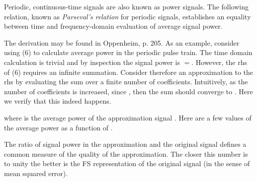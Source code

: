 \documentclass{article}
\begin{document}
\begin{CellGroup}
Periodic, continuous-time signals are also known as power signals. The following relation, known as {\itshape Parseval's relation} for periodic signals,
establishes an equality between time and frequency-domain evaluation of average signal power. 




The derivation may be found in Oppenheim, p. 205. As an example, consider using (6) to calculate average power in the periodic pulse train. The time
domain calculation is trivial and by inspection the signal power is \(=\)\inlineTFinmath{\tau }. However, the rhs of (6) requires
an infinite summation. Consider therefore an approximation to the rhs by evaluating the sum over a finite number of coefficients. Intuitively, as
the number of coefficients is increased, since , then the sum should converge to .
Here we verify that this indeed happens. 



where  is the average power of the approximation signal . Here are a few values of the average power
as a function of .



\begin{CellGroup}

\end{CellGroup}
The ratio of signal power in the approximation and the original signal defines a common measure of the quality of the approximation. The closer this
number is to unity the better is the FS representation of the original signal (in the sense of mean squared error). 


\end{CellGroup}
\end{document}
